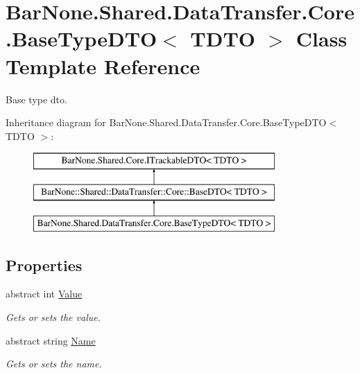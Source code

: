 \hypertarget{class_bar_none_1_1_shared_1_1_data_transfer_1_1_core_1_1_base_type_d_t_o}{}\section{Bar\+None.\+Shared.\+Data\+Transfer.\+Core.\+Base\+Type\+D\+TO$<$ T\+D\+TO $>$ Class Template Reference}
\label{class_bar_none_1_1_shared_1_1_data_transfer_1_1_core_1_1_base_type_d_t_o}


Base type dto.  


Inheritance diagram for Bar\+None.\+Shared.\+Data\+Transfer.\+Core.\+Base\+Type\+D\+TO$<$ T\+D\+TO $>$\+:\begin{figure}[H]
\begin{center}
\leavevmode
\includegraphics[height=3.000000cm]{class_bar_none_1_1_shared_1_1_data_transfer_1_1_core_1_1_base_type_d_t_o}
\end{center}
\end{figure}
\subsection*{Properties}
\begin{DoxyCompactItemize}
\item 
abstract int \mbox{\hyperlink{class_bar_none_1_1_shared_1_1_data_transfer_1_1_core_1_1_base_type_d_t_o_a7225dc6b32f827ac7386b89d7ee645b1}{Value}}
\begin{DoxyCompactList}\small\item\em Gets or sets the value. \end{DoxyCompactList}\item 
abstract string \mbox{\hyperlink{class_bar_none_1_1_shared_1_1_data_transfer_1_1_core_1_1_base_type_d_t_o_a0c9e21182df4230205fecb54043ba1e4}{Name}}
\begin{DoxyCompactList}\small\item\em Gets or sets the name. \end{DoxyCompactList}\end{DoxyCompactItemize}


